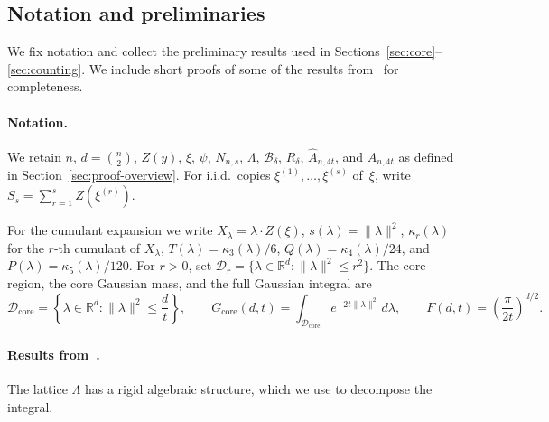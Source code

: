 \documentclass[11pt]{article}
\theoremstyle{definition}
\newcommand{\R}{\mathbb{R}}
\newcommand{\Bbox}{\mathcal{B}}
\newcommand{\Dd}{\mathcal{D}}
\newcommand{\corereg}{\mathcal{D}_\mathrm{core}}
\newcommand{\core}{G_{\mathrm{core}}}
\newcommand{\Ahat}{\hat A_{n,4t}}
\begin{document}
\subsection{Notation and preliminaries}\label{sec:prelim}

We fix notation and collect the preliminary results used in Sections~\ref{sec:core}--\ref{sec:counting}. We include short proofs of some of the results from~\cite{DL10} for completeness.

\paragraph{Notation.}
We retain \(n\), \(d=\binom{n}{2}\), \(Z(y)\), \(\xi\), \(\psi\), \(N_{n,s}\), \(\Lambda\), \(\Bbox_\delta\), \(R_\delta\), \(\Ahat\), and \(A_{n,4t}\) as defined in Section~\ref{sec:proof-overview}. For i.i.d.\ copies \(\xi^{(1)},\dots,\xi^{(s)}\) of~\(\xi\), write \(S_s=\sum_{r=1}^s Z(\xi^{(r)})\).

For the cumulant expansion we write \(X_\lambda=\lambda\cdot Z(\xi)\), \(s(\lambda)=\|\lambda\|^2\), \(\kappa_r(\lambda)\) for the \(r\)-th cumulant of \(X_\lambda\), \(T(\lambda)=\kappa_3(\lambda)/6\), \(Q(\lambda)=\kappa_4(\lambda)/24\), and \(P(\lambda)=\kappa_5(\lambda)/120\). For \(r>0\), set \(\Dd_r=\{\lambda\in\R^d:\|\lambda\|^2\le r^2\}\). The core region, the core Gaussian mass, and the full Gaussian integral are
\[
  \corereg=\left\{\lambda\in\R^d:\|\lambda\|^2\le \frac{d}{t}\right\},
  \qquad
  \core(d,t)=\int_{\corereg}e^{-2t\|\lambda\|^2}\,d\lambda,
  \qquad
  F(d,t)=\left(\frac{\pi}{2t}\right)^{d/2}.
\]

\paragraph{Results from~\cite{DL10}.}
The lattice \(\Lambda\) has a rigid algebraic structure, which we use to decompose the integral.
\end{document}
